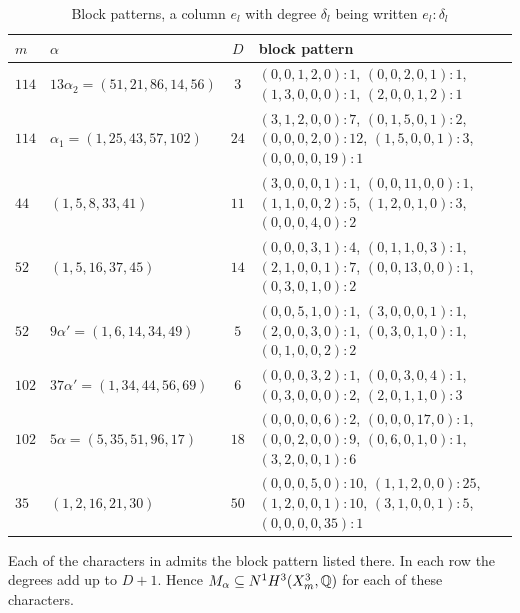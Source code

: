 \begin{table}[ht]
\centering
\caption{Block patterns, a column $e_{l}$ with degree $\delta_{l}$ being
written $e_{l}{:}\delta_{l}$}\label{tab:patterns}
\small
\setlength{\tabcolsep}{4pt}
\begin{tabular}{@{}llc>{\raggedright\arraybackslash}p{}@{}}
\toprule
$m$ & $\alpha$ & $D$ & block pattern\\
\midrule
$114$ & $13\alpha_{2}=(51,21,86,14,56)$ & $3$ & $(0,0,1,2,0){:}1$,
$(0,0,2,0,1){:}1$, $(1,3,0,0,0){:}1$, $(2,0,0,1,2){:}1$\\
$114$ & $\alpha_{1}=(1,25,43,57,102)$ & $24$ & $(3,1,2,0,0){:}7$,
$(0,1,5,0,1){:}2$, $(0,0,0,2,0){:}12$, $(1,5,0,0,1){:}3$,
$(0,0,0,0,19){:}1$\\
$44$ & $(1,5,8,33,41)$ & $11$ & $(3,0,0,0,1){:}1$, $(0,0,11,0,0){:}1$,
$(1,1,0,0,2){:}5$, $(1,2,0,1,0){:}3$, $(0,0,0,4,0){:}2$\\
$52$ & $(1,5,16,37,45)$ & $14$ & $(0,0,0,3,1){:}4$, $(0,1,1,0,3){:}1$,
$(2,1,0,0,1){:}7$, $(0,0,13,0,0){:}1$, $(0,3,0,1,0){:}2$\\
$52$ & $9\alpha'=(1,6,14,34,49)$ & $5$ & $(0,0,5,1,0){:}1$,
$(3,0,0,0,1){:}1$, $(2,0,0,3,0){:}1$, $(0,3,0,1,0){:}1$,
$(0,1,0,0,2){:}2$\\
$102$ & $37\alpha'=(1,34,44,56,69)$ & $6$ & $(0,0,0,3,2){:}1$,
$(0,0,3,0,4){:}1$, $(0,3,0,0,0){:}2$, $(2,0,1,1,0){:}3$\\
$102$ & $5\alpha=(5,35,51,96,17)$ & $18$ & $(0,0,0,0,6){:}2$,
$(0,0,0,17,0){:}1$, $(0,0,2,0,0){:}9$, $(0,6,0,1,0){:}1$,
$(3,2,0,0,1){:}6$\\
$35$ & $(1,2,16,21,30)$ & $50$ & $(0,0,0,5,0){:}10$, $(1,1,2,0,0){:}25$,
$(1,2,0,0,1){:}10$, $(3,1,0,0,1){:}5$, $(0,0,0,0,35){:}1$\\
\bottomrule
\end{tabular}
\end{table}

\begin{corollary}\label{cor:patterns}
Each of the characters in  admits the block pattern
listed there.
In each row the degrees add up to $D+1$. Hence $M_{\alpha}\subseteq N^{1}H^{3}
(X^{3}_{m},\mathbb{Q})$ for each of these characters.
\end{corollary}

